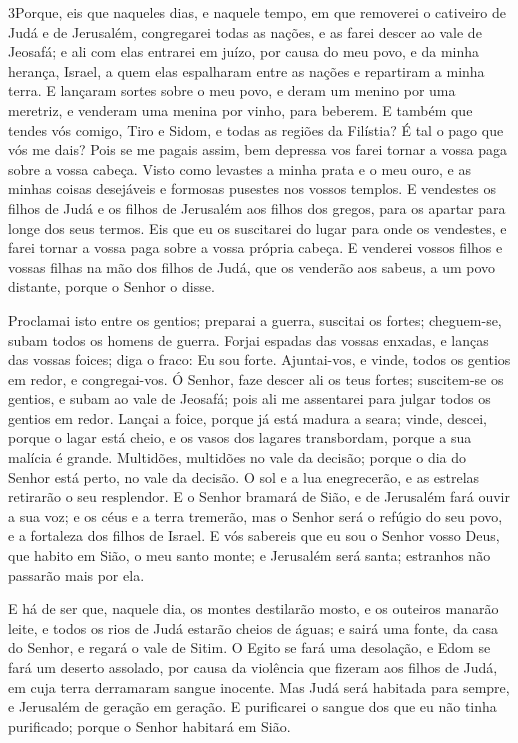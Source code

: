 \lettrine{3} Porque, eis que naqueles dias, e naquele tempo,
em que removerei o cativeiro de Judá e de Jerusalém, congregarei
todas as nações, e as farei descer ao vale de Jeosafá; e ali com
elas entrarei em juízo, por causa do meu povo, e da minha herança,
Israel, a quem elas espalharam entre as nações e repartiram a minha
terra. E lançaram sortes sobre o meu povo, e deram um menino por
uma meretriz, e venderam uma menina por vinho, para beberem. E
também que tendes vós comigo, Tiro e Sidom, e todas as regiões da
Filístia? É tal o pago que vós me dais? Pois se me pagais assim, bem
depressa vos farei tornar a vossa paga sobre a vossa cabeça.
Visto como levastes a minha prata e o meu ouro, e as minhas
coisas desejáveis e formosas pusestes nos vossos templos. E
vendestes os filhos de Judá e os filhos de Jerusalém aos filhos dos
gregos, para os apartar para longe dos seus termos. Eis que eu
os suscitarei do lugar para onde os vendestes, e farei tornar a
vossa paga sobre a vossa própria cabeça. E venderei vossos
filhos e vossas filhas na mão dos filhos de Judá, que os venderão
aos sabeus, a um povo distante, porque o Senhor o disse.

Proclamai isto entre os gentios; preparai a guerra, suscitai os
fortes; cheguem-se, subam todos os homens de guerra. Forjai
espadas das vossas enxadas, e lanças das vossas foices; diga o
fraco: Eu sou forte. Ajuntai-vos, e vinde, todos os gentios
em redor, e congregai-vos. Ó Senhor, faze descer ali os teus fortes;
suscitem-se os gentios, e subam ao vale de Jeosafá; pois ali
me assentarei para julgar todos os gentios em redor. Lançai a
foice, porque já está madura a seara; vinde, descei, porque o lagar
está cheio, e os vasos dos lagares transbordam, porque a sua malícia
é grande. Multidões, multidões no vale da decisão; porque o
dia do Senhor está perto, no vale da decisão. O sol e a lua
enegrecerão, e as estrelas retirarão o seu resplendor. E o
Senhor bramará de Sião, e de Jerusalém fará ouvir a sua voz; e os
céus e a terra tremerão, mas o Senhor será o refúgio do seu povo, e
a fortaleza dos filhos de Israel. E vós sabereis que eu sou o
Senhor vosso Deus, que habito em Sião, o meu santo monte; e
Jerusalém será santa; estranhos não passarão mais por ela.

E há de ser que, naquele dia, os montes destilarão mosto, e os
outeiros manarão leite, e todos os rios de Judá estarão cheios de
águas; e sairá uma fonte, da casa do Senhor, e regará o vale de
Sitim. O Egito se fará uma desolação, e Edom se fará um
deserto assolado, por causa da violência que fizeram aos filhos de
Judá, em cuja terra derramaram sangue inocente. Mas Judá será
habitada para sempre, e Jerusalém de geração em geração. E
purificarei o sangue dos que eu não tinha purificado; porque o
Senhor habitará em Sião.


